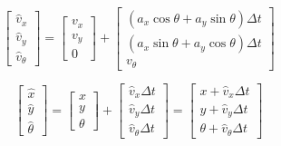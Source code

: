 \documentclass[oneside, 12pt, a4paper]{book}
\begin{document}
\begin{equation}
    \begin{bmatrix}
        \hat{v}_x \\ \hat{v}_y \\ \hat{v}_\theta
    \end{bmatrix}
    = 
    \begin{bmatrix}
        v_x \\ v_y \\ 0
    \end{bmatrix}
    +
    \begin{bmatrix}
        (a_x\cos\theta + a_y\sin\theta)\Delta t \\ (a_x\sin\theta + a_y\cos\theta)\Delta t \\ v_\theta
    \end{bmatrix}
\end{equation}

\begin{equation}
    \begin{bmatrix}
        \hat{x} \\ \hat{y} \\ \hat{\theta}
    \end{bmatrix}
    =
    \begin{bmatrix}
        x \\ y \\ \theta
    \end{bmatrix}
    +
    \begin{bmatrix}
        \hat{v}_x \Delta t \\ \hat{v}_y \Delta t \\ \hat{v}_\theta \Delta t
    \end{bmatrix}
    =     
    \begin{bmatrix}
        x + \hat{v}_x \Delta t \\ y + \hat{v}_y \Delta t \\ \theta + \hat{v}_\theta \Delta t
    \end{bmatrix}
\end{equation}
\end{document}
